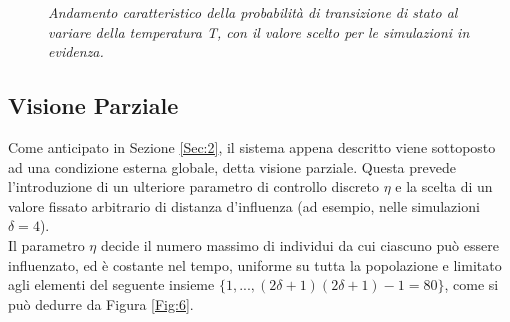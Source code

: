 \documentclass[letterpaper,10pt]{article}
\begin{document}
\bigskip
\begin{figure}[h]
\centering
{}
\caption{\textit{Andamento caratteristico della probabilità di transizione di stato al variare della temperatura T, con il valore scelto per le simulazioni in evidenza.}}
\label{Fig:5}
\end{figure}

\bigskip \bigskip
\subsection{Visione Parziale}
\label{Sec:3.2}

Come anticipato in Sezione \ref{Sec:2}, il sistema appena descritto viene sottoposto ad una condizione esterna globale, detta visione parziale. Questa prevede l'introduzione di un ulteriore parametro di controllo discreto $\eta$ e la scelta di un valore fissato arbitrario di distanza d'influenza (ad esempio, nelle simulazioni $\delta=4$).
\\ Il parametro $\eta$ decide il numero massimo di individui da cui ciascuno può essere influenzato, ed è costante nel tempo, uniforme su tutta la popolazione e limitato agli elementi del seguente insieme $\{ 1, ..., (2\delta+1)(2\delta+1)-1=80\}$, come si può dedurre da Figura \ref{Fig:6}.
\end{document}

